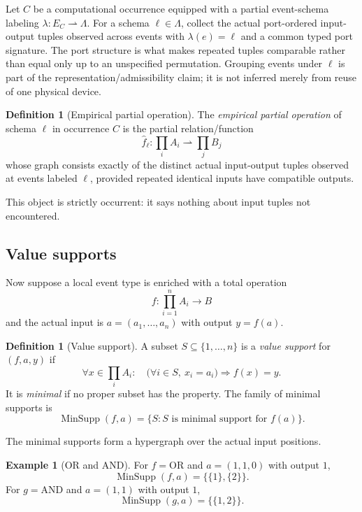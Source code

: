 \documentclass[11pt,a4paper]{article}
\theoremstyle{clean}
\theoremstyle{definition}
\newtheorem{definition}[theorem]{Definition}
\newtheorem{example}[theorem]{Example}
\newcommand{\MinSupp}{\operatorname{MinSupp}}
\begin{document}
Let $C$ be a computational occurrence equipped with a partial event-schema labeling $\lambda:E_C\rightharpoonup\Lambda$. For a schema $\ell\in\Lambda$, collect the actual port-ordered input-output tuples observed across events with $\lambda(e)=\ell$ and a common typed port signature. The port structure is what makes repeated tuples comparable rather than equal only up to an unspecified permutation. Grouping events under $\ell$ is part of the representation/admissibility claim; it is not inferred merely from reuse of one physical device.

\begin{definition}[Empirical partial operation]
The \emph{empirical partial operation} of schema $\ell$ in occurrence $C$ is the partial relation/function
\[
\widehat f_\ell:\prod_i A_i\rightharpoonup \prod_j B_j
\]
whose graph consists exactly of the distinct actual input-output tuples observed at events labeled $\ell$, provided repeated identical inputs have compatible outputs.
\end{definition}

This object is strictly occurrent: it says nothing about input tuples not encountered.

\subsection{Value supports}

Now suppose a local event type is enriched with a total operation
\[
f:\prod_{i=1}^n A_i\to B
\]
and the actual input is $a=(a_1,\dots,a_n)$ with output $y=f(a)$.

\begin{definition}[Value support]
A subset $S\subseteq\{1,\dots,n\}$ is a \emph{value support} for $(f,a,y)$ if
\[
\forall x\in\prod_i A_i:\quad \bigl(\forall i\in S,\ x_i=a_i\bigr)\Rightarrow f(x)=y.
\]
It is \emph{minimal} if no proper subset has the property. The family of minimal supports is
\[
\MinSupp(f,a)=\{S:S\text{ is minimal support for }f(a)\}.
\]
\end{definition}

The minimal supports form a hypergraph over the actual input positions.

\begin{example}[OR and AND]
For $f=\mathrm{OR}$ and $a=(1,1,0)$ with output $1$,
\[
\MinSupp(f,a)=\bigl\{\{1\},\{2\}\bigr\}.
\]
For $g=\mathrm{AND}$ and $a=(1,1)$ with output $1$,
\[
\MinSupp(g,a)=\bigl\{\{1,2\}\bigr\}.
\]
\end{example}
\end{document}
